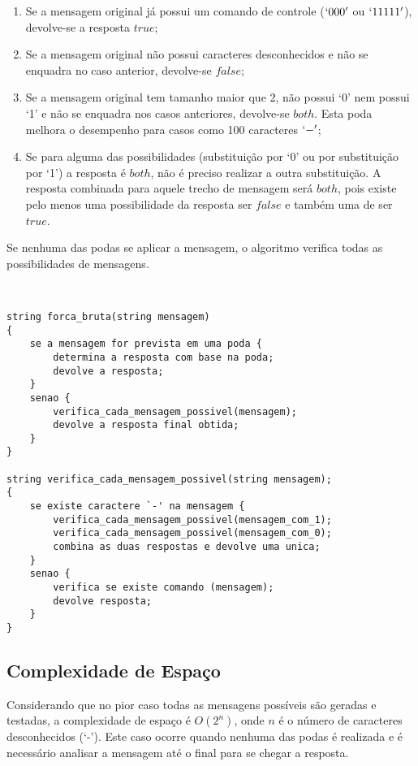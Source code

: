 \documentclass[a4paper,12pt,titlepage]{article}
\begin{document}
\begin{enumerate}[leftmargin=1.5cm]
    \item Se a mensagem original já possui um comando de controle ($`000'$ ou $`11111'$), devolve-se a resposta $true$;  
    \item Se a mensagem original não possui caracteres desconhecidos e não se enquadra no caso anterior, devolve-se $false$;
    \item Se a mensagem original tem tamanho maior que 2, não possui `0' nem possui `1' e não se enquadra nos casos anteriores, devolve-se $both$. Esta poda melhora o desempenho para casos como 100 caracteres $`-'$;
    \item Se para alguma das possibilidades (substituição por `0' ou por substituição por `1') a resposta é $both$, não é preciso realizar a outra substituição. A resposta combinada para aquele trecho de mensagem será $both$, pois existe pelo menos uma possibilidade da resposta ser $false$ e também uma de ser $true$.
    \ \\
\end{enumerate}

Se nenhuma das podas se aplicar a mensagem, o algoritmo verifica todas as possibilidades de mensagens.

\ \\ 

\begin{lstlisting}[caption=Algoritmo de Força Bruta]
string forca_bruta(string mensagem)
{
    se a mensagem for prevista em uma poda {
        determina a resposta com base na poda;
        devolve a resposta;
    } 
    senao {
        verifica_cada_mensagem_possivel(mensagem);
        devolve a resposta final obtida;
    }
}

string verifica_cada_mensagem_possivel(string mensagem);
{
    se existe caractere `-' na mensagem {
        verifica_cada_mensagem_possivel(mensagem_com_1);
        verifica_cada_mensagem_possivel(mensagem_com_0);
        combina as duas respostas e devolve uma unica;
    }
    senao {
        verifica se existe comando (mensagem);
        devolve resposta;
    }
}
\end{lstlisting}

\subsection{Complexidade de Espaço}

Considerando que no pior caso todas as mensagens possíveis são geradas e testadas, a complexidade de espaço é $O(2^n)$, onde $n$ é o número de caracteres desconhecidos (`-'). Este caso ocorre quando nenhuma das podas é realizada e é necessário analisar a mensagem até o final para se chegar a resposta.
\end{document}
